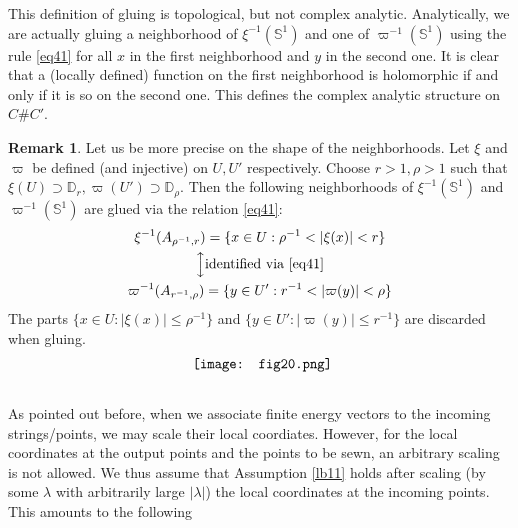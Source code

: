 \documentclass[12pt,a4paper,notitlepage]{article}
\theoremstyle{definition}
\newtheorem{rem}[df]{Remark}
\theoremstyle{plain}
\newcommand{\Dbb}{\mathbb D}
\newcommand{\Sbb}{{\mathbb S}}
\numberwithin{equation}{section}
\begin{document}
This definition of gluing is topological, but not complex analytic. Analytically, we are actually gluing a neighborhood of $\xi^{-1}(\Sbb^1)$ and one of $\varpi^{-1}(\Sbb^1)$ using the rule \eqref{eq41} for all $x$ in the first neighborhood and $y$ in the second one. It is clear that a (locally defined) function on the first neighborhood is holomorphic if and only if it is so on the second one. This defines the complex analytic structure on $C\#C'$.


\begin{rem}\label{lb33}
Let us be more precise on the shape of the neighborhoods. Let $\xi$ and $\varpi$ be defined (and injective) on $U,U'$ respectively. Choose $r>1,\rho>1$ such that $\xi(U)\supset \Dbb_r,\varpi(U')\supset\Dbb_\rho$. Then the following neighborhoods of $\xi^{-1}(\Sbb^1)$ and $\varpi^{-1}(\Sbb^1)$ are glued via the relation \eqref{eq41}:
\begin{gather}\label{eq154}
	\begin{gathered}
\xi^{-1}(A_{\rho^{-1},r})=\{x\in U: \rho^{-1}<|\xi(x)|<r\}\\
\Big\updownarrow\text{identified via } \eqref{eq41}\\	
\varpi^{-1}(A_{r^{-1},\rho})=\{y\in U':r^{-1}<|\varpi(y)|<\rho\}
	\end{gathered}	
\end{gather}
The parts $\{x\in U:|\xi(x)|\leq \rho^{-1}\}$ and $\{y\in U':|\varpi(y)|\leq r^{-1}\}$ are discarded when gluing.
\begin{align}
	\vcenter{\hbox{{
				\texttt{[image: fig20.png]}}}}  \label{eq43}
\end{align}
\end{rem}



\subsection{}




As pointed out before, when we associate finite energy vectors to the incoming  strings/points, we may scale their local coordiates. However, for the local coordinates at the output points and the points to be sewn, an arbitrary scaling is not allowed. We thus assume that Assumption \ref{lb11} holds after scaling (by some $\lambda$ with arbitrarily large $|\lambda|$) the local coordinates at the incoming points. This amounts to the following
\end{document}
